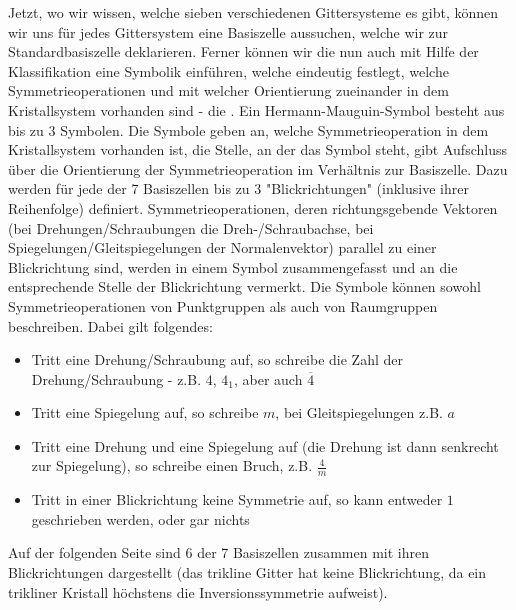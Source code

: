 Jetzt, wo wir wissen, welche sieben verschiedenen Gittersysteme es gibt, können wir uns für jedes Gittersystem eine Basiszelle aussuchen, welche wir zur Standardbasiszelle deklarieren. Ferner können wir die nun auch mit Hilfe der Klassifikation eine Symbolik einführen, welche eindeutig festlegt, welche Symmetrieoperationen und mit welcher Orientierung zueinander in dem Kristallsystem vorhanden sind - die . Ein Hermann-Mauguin-Symbol besteht aus bis zu 3 Symbolen. Die Symbole geben an, welche Symmetrieoperation in dem Kristallsystem vorhanden ist, die Stelle, an der das Symbol steht, gibt Aufschluss über die Orientierung der Symmetrieoperation im Verhältnis zur Basiszelle. Dazu werden für jede der 7 Basiszellen bis zu 3 "Blickrichtungen" (inklusive ihrer Reihenfolge) definiert. Symmetrieoperationen, deren richtungsgebende Vektoren (bei Drehungen/Schraubungen die Dreh-/Schraubachse, bei Spiegelungen/Gleitspiegelungen der Normalenvektor) parallel zu einer  Blickrichtung sind, werden in einem Symbol zusammengefasst und an die entsprechende Stelle der Blickrichtung vermerkt. Die Symbole können sowohl Symmetrieoperationen von Punktgruppen als auch von Raumgruppen beschreiben. Dabei gilt folgendes:
\begin{itemize}
	\item Tritt eine Drehung/Schraubung auf, so schreibe die Zahl der Drehung/Schraubung - z.B. $4$, $4_1$, aber auch $\overline{4}$
	\item Tritt eine Spiegelung auf, so schreibe $m$, bei Gleitspiegelungen z.B. $a$
	\item Tritt eine Drehung und eine Spiegelung auf (die Drehung ist dann senkrecht zur Spiegelung), so schreibe einen Bruch, z.B. $\frac{4}{m}$
	\item Tritt in einer Blickrichtung keine Symmetrie auf, so kann entweder $1$ geschrieben werden, oder gar nichts
\end{itemize}
Auf der folgenden Seite sind 6 der 7 Basiszellen zusammen mit ihren Blickrichtungen dargestellt (das trikline Gitter hat keine Blickrichtung, da ein trikliner Kristall höchstens die Inversionssymmetrie aufweist).



